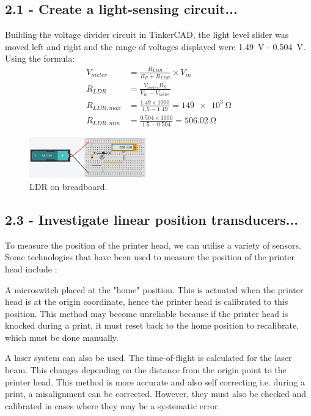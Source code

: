 \documentclass[conference]{IEEEtran}
\begin{document}
\subsection*{2.1 - Create a light-sensing circuit...}
Building the voltage divider circuit in TinkerCAD, the light level slider was moved left and right and the range of voltages displayed were \SI{1.49}{\volt} - \SI{0.504}{\volt}. Using the formula:
\begin{align}
    V_{meter} &= \frac{R_{LDR}}{R_{R} + R_{LDR}} \times V_{in}\\
    R_{LDR} &= \frac{V_{meter}R_{R}}{V_{in} - V_{meter}}\\
    R_{LDR,max} &= \frac{1.49\times 1000}{1.5-1.49} = \SI{149e3}{\ohm}\\
    R_{LDR,min} &= \frac{0.504\times 1000}{1.5 - 0.504} = \SI{506.02}{\ohm}
\end{align}
\begin{figure}[htbp]
    \centerline{\includegraphics[width = 0.45\textwidth]{q2-1BreadBoard.png}}
    \caption{LDR on breadboard.}
\end{figure}
\subsection*{2.3 - Investigate linear position transducers...}
To measure the position of the printer head, we can utilise a variety of sensors. Some technologies that have been used to measure the position of the printer head include \cite{b2}:

A microswitch placed at the "home" position. This is actuated when the printer head is at the origin coordinate, hence the printer head is calibrated to this position. This method may become unreliable because if the printer head is knocked during a print, it must reset back to the home position to recalibrate, which must be done manually. 

A laser system can also be used. The time-of-flight is calculated for the laser beam. This changes depending on the distance from the origin point to the printer head. This method is more accurate and also self correcting i.e. during a print, a misalignment can be corrected. However, they must also be checked and calibrated in cases where they may be a systematic error.
\end{document}
